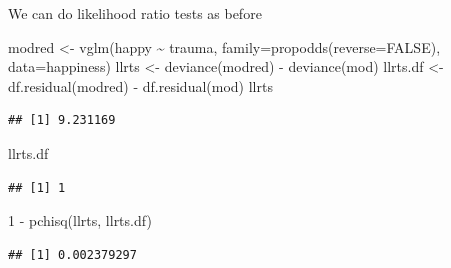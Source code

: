 \documentclass[
  ignorenonframetext,
]{beamer}
\newenvironment{Shaded}{\begin{snugshade}}{\end{snugshade}}
\newcommand{\AttributeTok}[1]{\textcolor[rgb]{0.77,0.63,0.00}{#1}}
\newcommand{\ConstantTok}[1]{\textcolor[rgb]{0.00,0.00,0.00}{#1}}
\newcommand{\DecValTok}[1]{\textcolor[rgb]{0.00,0.00,0.81}{#1}}
\newcommand{\FunctionTok}[1]{\textcolor[rgb]{0.00,0.00,0.00}{#1}}
\newcommand{\NormalTok}[1]{#1}
\newcommand{\OtherTok}[1]{\textcolor[rgb]{0.56,0.35,0.01}{#1}}
\newcommand{\SpecialCharTok}[1]{\textcolor[rgb]{0.00,0.00,0.00}{#1}}
\begin{document}
\begin{frame}[fragile]{}
\protect\hypertarget{section-5}{}
We can do likelihood ratio tests as before

\vspace{12pt}
\tiny

\begin{Shaded}
\begin{Highlighting}[]
\NormalTok{modred }\OtherTok{\textless{}{-}} \FunctionTok{vglm}\NormalTok{(happy }\SpecialCharTok{\textasciitilde{}}\NormalTok{ trauma, }\AttributeTok{family=}\FunctionTok{propodds}\NormalTok{(}\AttributeTok{reverse=}\ConstantTok{FALSE}\NormalTok{),}
               \AttributeTok{data=}\NormalTok{happiness)}
\NormalTok{llrts }\OtherTok{\textless{}{-}} \FunctionTok{deviance}\NormalTok{(modred) }\SpecialCharTok{{-}} \FunctionTok{deviance}\NormalTok{(mod)}
\NormalTok{llrts.df }\OtherTok{\textless{}{-}} \FunctionTok{df.residual}\NormalTok{(modred) }\SpecialCharTok{{-}} \FunctionTok{df.residual}\NormalTok{(mod)}
\NormalTok{llrts}
\end{Highlighting}
\end{Shaded}

\begin{verbatim}
## [1] 9.231169
\end{verbatim}

\begin{Shaded}
\begin{Highlighting}[]
\NormalTok{llrts.df}
\end{Highlighting}
\end{Shaded}

\begin{verbatim}
## [1] 1
\end{verbatim}

\begin{Shaded}
\begin{Highlighting}[]
\DecValTok{1} \SpecialCharTok{{-}} \FunctionTok{pchisq}\NormalTok{(llrts, llrts.df)}
\end{Highlighting}
\end{Shaded}

\begin{verbatim}
## [1] 0.002379297
\end{verbatim}
\end{frame}
\end{document}
